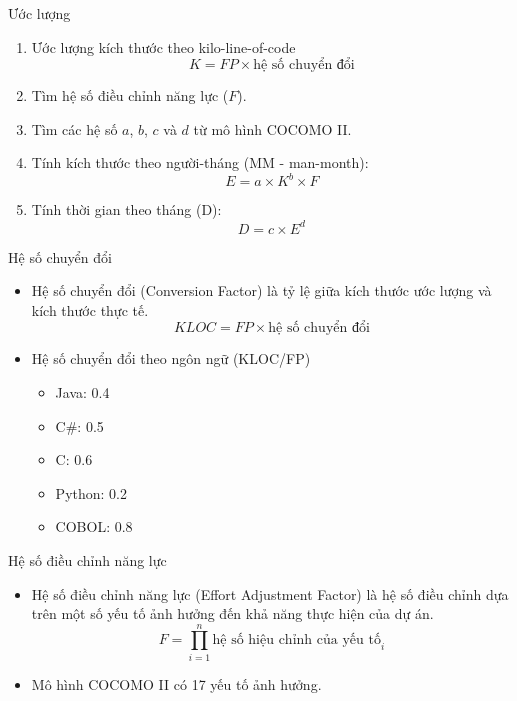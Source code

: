 \documentclass{beamer}
\begin{document}
\begin{frame}{Ước lượng}
    \begin{block}{}
        \begin{enumerate}
            \item Ước lượng kích thước theo kilo-line-of-code
            \[K = FP \times \text{hệ số chuyển đổi}\]
            \item Tìm hệ số điều chỉnh năng lực ($F$).
            \item Tìm các hệ số $a$, $b$, $c$ và $d$ từ mô hình COCOMO II.
            \item Tính kích thước theo người-tháng (MM - man-month):
            \[E = a \times K^b \times F\]
            \item Tính thời gian theo tháng (D):
            \[D = c \times E^d\]
        \end{enumerate}
    \end{block}
\end{frame}

\begin{frame}{Hệ số chuyển đổi}
    \begin{block}{}
        \begin{itemize}
            \item Hệ số chuyển đổi (Conversion Factor) là tỷ lệ
            giữa kích thước ước lượng và kích thước thực tế.
            \[KLOC = FP \times \text{hệ số chuyển đổi}\]
            \item Hệ số chuyển đổi theo ngôn ngữ (KLOC/FP)
            \begin{itemize}
                \item Java: 0.4
                \item C\#: 0.5
                \item C: 0.6
                \item Python: 0.2
                \item COBOL: 0.8
            \end{itemize}
        \end{itemize}
    \end{block}
\end{frame}

\begin{frame}{Hệ số điều chỉnh năng lực}
    \begin{block}{}
        \begin{itemize}
            \item Hệ số điều chỉnh năng lực (Effort Adjustment Factor) là
            hệ số điều chỉnh dựa trên một số yếu tố ảnh hưởng
            đến khả năng thực hiện của dự án.
            \[F = \prod_{i=1}^n \text{hệ số hiệu chỉnh của yếu tố}_i\]
            \item Mô hình COCOMO II có 17 yếu tố ảnh hưởng.
        \end{itemize}
    \end{block}
\end{frame}
\end{document}
